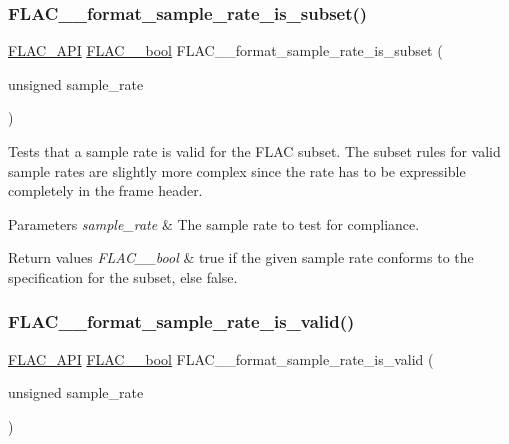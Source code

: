 \subsubsection{\texorpdfstring{F\+L\+A\+C\+\_\+\+\_\+format\+\_\+sample\+\_\+rate\+\_\+is\+\_\+subset()}{FLAC\_\_format\_sample\_rate\_is\_subset()}}
{\footnotesize\ttfamily \hyperlink{group__flac__export_ga56ca07df8a23310707732b1c0007d6f5}{F\+L\+A\+C\+\_\+\+A\+PI} \hyperlink{ordinals_8h_a95103469f1cbd78b8cf250194985b34e}{F\+L\+A\+C\+\_\+\+\_\+bool} F\+L\+A\+C\+\_\+\+\_\+format\+\_\+sample\+\_\+rate\+\_\+is\+\_\+subset (\begin{DoxyParamCaption}\item[{unsigned}]{sample\+\_\+rate }\end{DoxyParamCaption})}

Tests that a sample rate is valid for the F\+L\+AC subset. The subset rules for valid sample rates are slightly more complex since the rate has to be expressible completely in the frame header.


\begin{DoxyParams}{Parameters}
{\em sample\+\_\+rate} & The sample rate to test for compliance. \\
\hline
\end{DoxyParams}

\begin{DoxyRetVals}{Return values}
{\em F\+L\+A\+C\+\_\+\+\_\+bool} & {\ttfamily true} if the given sample rate conforms to the specification for the subset, else {\ttfamily false}. \\
\hline
\end{DoxyRetVals}
\mbox{\label{group__flac__format_gaec1c46afe33c0bb200be68bb36e0dd32}} 
\subsubsection{\texorpdfstring{F\+L\+A\+C\+\_\+\+\_\+format\+\_\+sample\+\_\+rate\+\_\+is\+\_\+valid()}{FLAC\_\_format\_sample\_rate\_is\_valid()}}
{\footnotesize\ttfamily \hyperlink{group__flac__export_ga56ca07df8a23310707732b1c0007d6f5}{F\+L\+A\+C\+\_\+\+A\+PI} \hyperlink{ordinals_8h_a95103469f1cbd78b8cf250194985b34e}{F\+L\+A\+C\+\_\+\+\_\+bool} F\+L\+A\+C\+\_\+\+\_\+format\+\_\+sample\+\_\+rate\+\_\+is\+\_\+valid (\begin{DoxyParamCaption}\item[{unsigned}]{sample\+\_\+rate }\end{DoxyParamCaption})}

